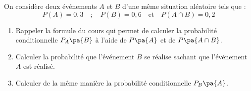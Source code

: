 \begin{exo}
	On considère deux événements $A$ et $B$ d'une même situation aléatoire tels que :
	\[
		P(A) = 0,3 \quad ; \quad P(B) = 0,6 \quad \text{et} \quad P(A \cap B) = 0,2
	\]

	\begin{enumerate}
		\item Rappeler la formule du cours qui permet de calculer la probabilité conditionnelle $P_{A}\pa{B}$ à l'aide de $P\pa{A}$ et de $P\pa{A \cap B}$.
		\item Calculer la probabilité que l'événement $B$ se réalise sachant que l'événement $A$ est réalisé.
		\item Calculer de la même manière la probabilité conditionnelle $P_{B}\pa{A}$.
	\end{enumerate}
\end{exo}
